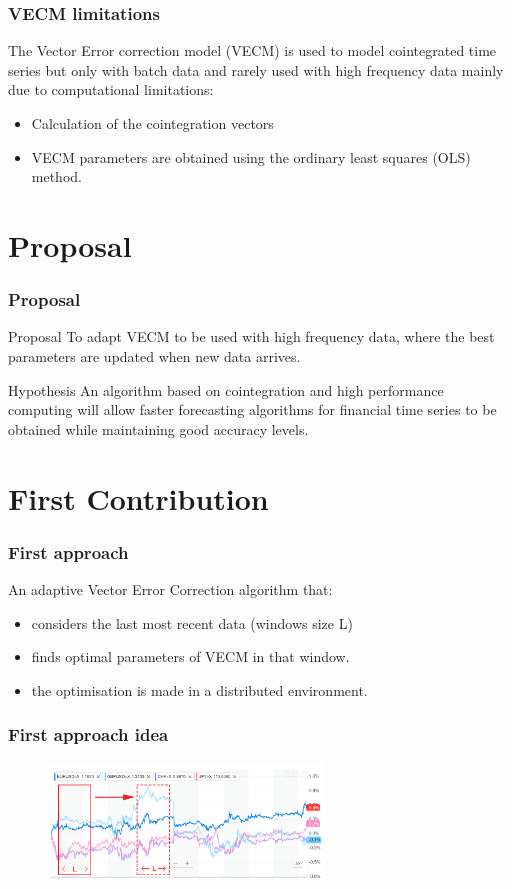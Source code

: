 \documentclass{beamer}
\begin{document}
\begin{frame}
\frametitle{VECM limitations}
The Vector Error correction model (VECM) is used to model cointegrated time series but only with batch data and rarely used with high frequency data  mainly due to computational limitations:
\begin{itemize}
\item Calculation of the cointegration vectors
\item VECM parameters are obtained using the ordinary least squares (OLS) method.
\end{itemize}
\end{frame}



\section{Proposal}
\begin{frame}
\frametitle{Proposal}
\begin{block}{Proposal}
To adapt VECM to be used with high frequency data, where the best parameters are updated when new data arrives.
\end{block}
\begin{block}{Hypothesis}
An algorithm based on cointegration and high performance computing will allow faster forecasting
algorithms for financial time series to be obtained while maintaining good accuracy levels.
\end{block}
\end{frame}

\section{First Contribution}
\begin{frame}
\frametitle{First approach}
An adaptive Vector Error Correction algorithm that:
\begin{itemize}
\item considers the last most recent data (windows size L)
\item finds optimal parameters of VECM in that window.
\item the optimisation is made in a distributed environment.
\end{itemize}
\end{frame}

\begin{frame}
\frametitle{First approach idea}
\begin{figure}
\includegraphics[width=0.65\textwidth]{img/slidingwindow}
\end{figure}
\end{frame}
\end{document}
